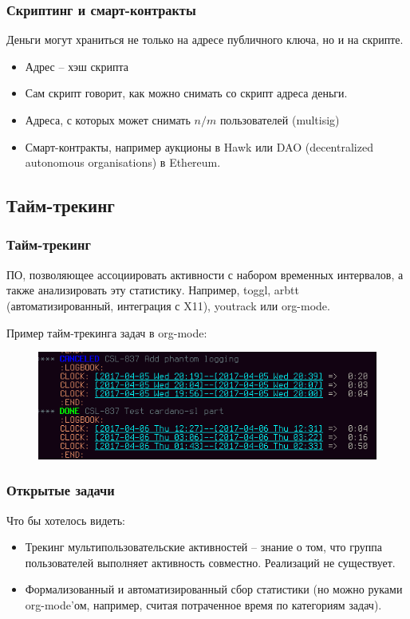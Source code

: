 \documentclass[11pt,handout,pdf,hyperref={unicode}]{beamer}
\begin{document}
%

\begin{frame}
  \frametitle{Скриптинг и смарт-контракты}

  Деньги могут храниться не только на адресе публичного ключа, но и на скрипте.
  \begin{itemize}
  \item Адрес -- хэш скрипта
  \item Сам скрипт говорит, как можно снимать со скрипт адреса деньги.
  \item Адреса, с которых может снимать $n/m$ пользователей (multisig)
  \item Смарт-контракты, например аукционы в Hawk \parencite{kosba2016hawk}
    или DAO (decentralized autonomous organisations) в Ethereum.
  \end{itemize}
\end{frame}

\subsection{Тайм-трекинг}

\begin{frame}
  \frametitle{Тайм-трекинг}

  ПО, позволяющее ассоциировать активности с набором временных
  интервалов, а также анализировать эту статистику. Например, toggl,
  arbtt (автоматизированный, интеграция с X11), youtrack или org-mode.

  Пример тайм-трекинга задач в org-mode:
  \begin{figure}[t]
  \includegraphics[scale=0.5]{org_mode_task}
  \centering
  \end{figure}
\end{frame}

\begin{frame}
  \frametitle{Открытые задачи}

  Что бы хотелось видеть:
  \begin{itemize}
  \item Трекинг мультипользовательские активностей -- знание о том,
    что группа пользователей выполняет активность
    совместно. Реализаций не существует.
  \item Формализованный и автоматизированный сбор статистики (но можно
    руками org-mode'ом, например, считая потраченное время по
    категориям задач).
  \end{itemize}
\end{frame}
\end{document}
